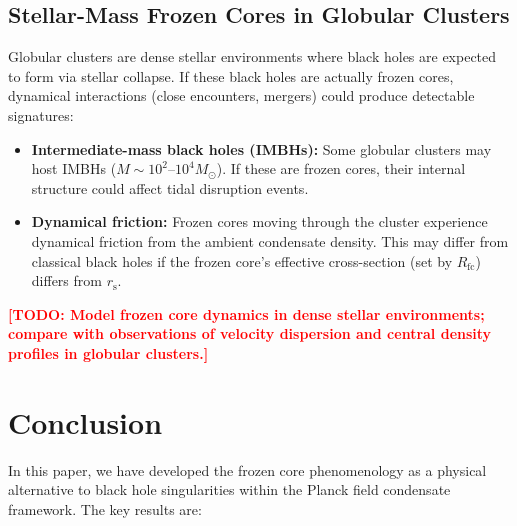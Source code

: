 \documentclass[12pt,a4paper]{article}
\newcommand{\TODO}[1]{\textcolor{red}{\textbf{[TODO: #1]}}}
\newcommand{\Rfc}{R_\text{fc}}
\theoremstyle{definition}
\begin{document}
\subsection{Stellar-Mass Frozen Cores in Globular Clusters}
\label{subsec:stellar_mass_frozen_cores}

Globular clusters are dense stellar environments where black holes are expected to form via stellar collapse. If these black holes are actually frozen cores, dynamical interactions (close encounters, mergers) could produce detectable signatures:

\begin{itemize}
  \item \textbf{Intermediate-mass black holes (IMBHs):} Some globular clusters may host IMBHs ($M \sim 10^2$--$10^4 M_\odot$). If these are frozen cores, their internal structure could affect tidal disruption events.
  \item \textbf{Dynamical friction:} Frozen cores moving through the cluster experience dynamical friction from the ambient condensate density. This may differ from classical black holes if the frozen core's effective cross-section (set by $\Rfc$) differs from $r_\text{s}$.
\end{itemize}

\TODO{Model frozen core dynamics in dense stellar environments; compare with observations of velocity dispersion and central density profiles in globular clusters.}

\section{Conclusion}
\label{sec:conclusion}

In this paper, we have developed the frozen core phenomenology as a physical alternative to black hole singularities within the Planck field condensate framework. The key results are:
\end{document}
